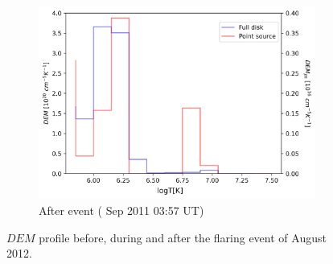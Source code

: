 \begin{figure}[h!]
\begin{subfigure}[b]{0.3\textwidth}
        \includegraphics[width=\textwidth]{images/dem_profile_after_event_2012_aug_31.png}
        \caption{After event ( Sep 2011 03:57 UT)}
    \end{subfigure}

    \caption[DEM profile for  August 2012 Event]{$DEM$ profile before, during and after the flaring event of  August 2012.}
    \label{fig:dem_pro_aug_31_2012}
\end{figure}

